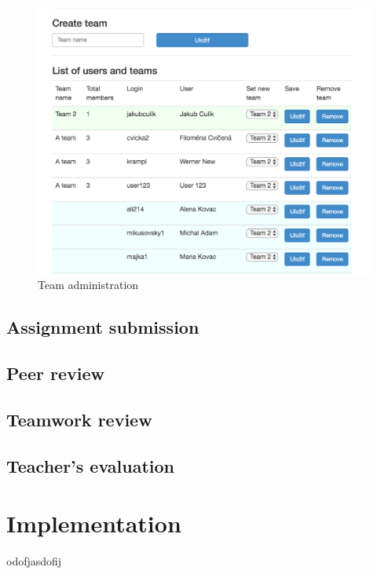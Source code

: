 \begin{figure}[h]
    \centering
    \includegraphics[width=\textwidth]{images/teamadmin.png}
    \caption{Team administration}
    \label{team_forming}
\end{figure}


\subsection{Assignment submission}

\subsection{Peer review}

\subsection{Teamwork review}

\subsection{Teacher's evaluation}

\section{Implementation}
odofjasdofij
